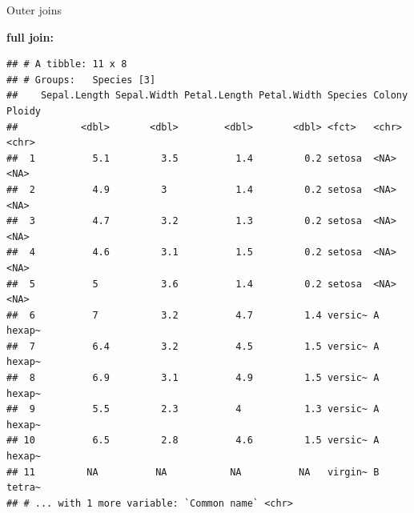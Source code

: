 \documentclass[14pt,ignorenonframetext,]{bredelebeamer}
\newenvironment{Shaded}{\begin{snugshade}}{\end{snugshade}}
\newcommand{\KeywordTok}[1]{\textcolor[rgb]{0.94,0.87,0.69}{#1}}
\newcommand{\DataTypeTok}[1]{\textcolor[rgb]{0.87,0.87,0.75}{#1}}
\newcommand{\StringTok}[1]{\textcolor[rgb]{0.80,0.58,0.58}{#1}}
\newcommand{\OperatorTok}[1]{\textcolor[rgb]{0.94,0.94,0.82}{#1}}
\newcommand{\NormalTok}[1]{\textcolor[rgb]{0.80,0.80,0.80}{#1}}
\begin{document}
\begin{frame}[fragile]{Outer joins}

\small
\textbf{full join:}

\begin{Shaded}
\end{Shaded}

\begin{verbatim}
## # A tibble: 11 x 8
## # Groups:   Species [3]
##    Sepal.Length Sepal.Width Petal.Length Petal.Width Species Colony Ploidy
##           <dbl>       <dbl>        <dbl>       <dbl> <fct>   <chr>  <chr> 
##  1          5.1         3.5          1.4         0.2 setosa  <NA>   <NA>  
##  2          4.9         3            1.4         0.2 setosa  <NA>   <NA>  
##  3          4.7         3.2          1.3         0.2 setosa  <NA>   <NA>  
##  4          4.6         3.1          1.5         0.2 setosa  <NA>   <NA>  
##  5          5           3.6          1.4         0.2 setosa  <NA>   <NA>  
##  6          7           3.2          4.7         1.4 versic~ A      hexap~
##  7          6.4         3.2          4.5         1.5 versic~ A      hexap~
##  8          6.9         3.1          4.9         1.5 versic~ A      hexap~
##  9          5.5         2.3          4           1.3 versic~ A      hexap~
## 10          6.5         2.8          4.6         1.5 versic~ A      hexap~
## 11         NA          NA           NA          NA   virgin~ B      tetra~
## # ... with 1 more variable: `Common name` <chr>
\end{verbatim}

\end{frame}
\end{document}
